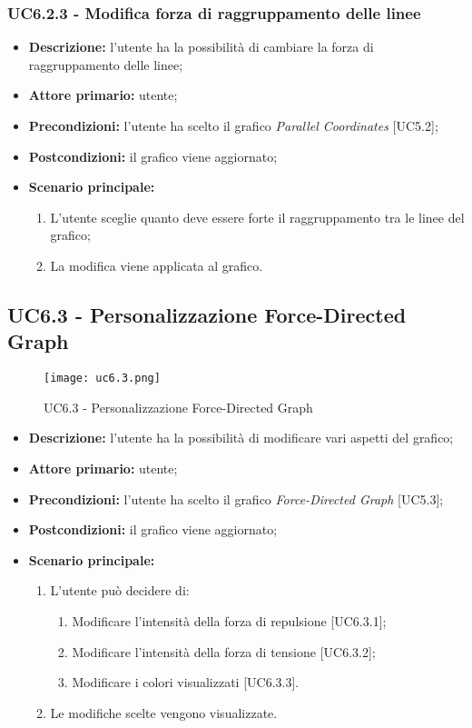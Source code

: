 \subsubsection{UC6.2.3 - Modifica forza di raggruppamento delle linee}
\begin{itemize}
  \item \textbf{Descrizione:} l'utente ha la possibilità di cambiare la forza di raggruppamento delle linee;
  \item \textbf{Attore primario:} utente;
  \item \textbf{Precondizioni:} l’utente ha scelto il grafico \textit{Parallel Coordinates} [UC5.2];
  \item \textbf{Postcondizioni:} il grafico viene aggiornato;
  \item \textbf{Scenario principale:}
    \begin{enumerate}
    \item L'utente sceglie quanto deve essere forte il raggruppamento tra le linee del grafico;
    \item La modifica viene applicata al grafico.
  \end{enumerate}
\end{itemize}

\subsection{UC6.3 - Personalizzazione Force-Directed Graph}
\begin{figure}[H]
  \centering
  \texttt{[image: uc6.3.png]}
  \caption{UC6.3 - Personalizzazione Force-Directed Graph}
\end{figure}
\begin{itemize}
    \item \textbf{Descrizione:} l'utente ha la possibilità di modificare vari aspetti del grafico;
    \item \textbf{Attore primario:} utente;
    \item \textbf{Precondizioni:} l’utente ha scelto il grafico \textit{Force-Directed Graph} [UC5.3];
    \item \textbf{Postcondizioni:} il grafico viene aggiornato;
    \item \textbf{Scenario principale:}
    \begin{enumerate}
      \item L'utente può decidere di:
    \begin{enumerate}
      \item Modificare l'intensità della forza di repulsione [UC6.3.1];
      \item Modificare l'intensità della forza di tensione [UC6.3.2];
      \item Modificare i colori visualizzati [UC6.3.3].
    \end{enumerate}
    \item Le modifiche scelte vengono visualizzate.
  \end{enumerate}
  \end{itemize}

